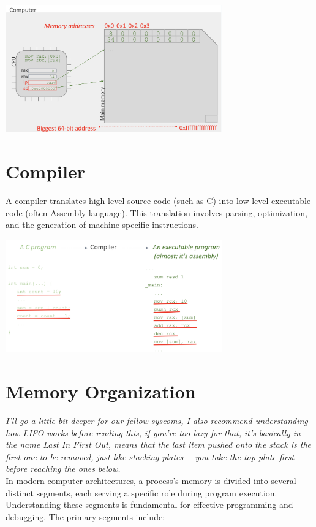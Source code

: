 \begin{center}
    \includegraphics[width=0.7\textwidth]{chapters/L2/images/registers.png}
\end{center}

\section{Compiler}
A compiler translates high-level source code (such as C) into low-level executable code (often Assembly language). This translation involves parsing, optimization, and the generation of machine-specific instructions.

\begin{center}
    \includegraphics[width=0.7\textwidth]{chapters/L2/images/compiler.png}
\end{center}
\newpage

\section{Memory Organization}
\textit{I'll go a little bit deeper for our fellow syscoms, I also recommend understanding how LIFO works before reading this, if you're too lazy for that, it's basically in the name Last In First Out, means that the last item pushed onto the stack is the first one to be removed, just like stacking plates— you take the top plate first before reaching the ones below. } \\
In modern computer architectures, a process's memory is divided into several distinct segments, each serving a specific role during program execution. Understanding these segments is fundamental for effective programming and debugging. The primary segments include:

